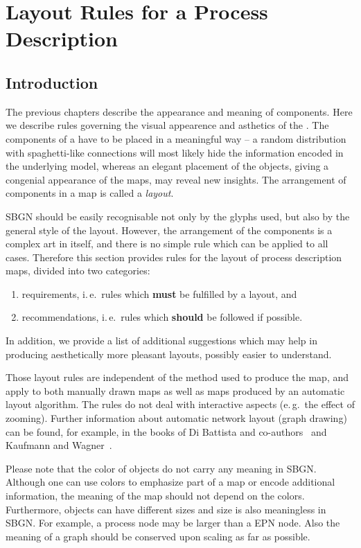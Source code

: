 \chapter{Layout Rules for a Process Description}
\label{chp:layout}

\section{Introduction}

The previous chapters describe the appearance and meaning of
\SBGNPDLone components. Here we describe rules governing the visual
appearence and asthetics of the \PDl. The components of a \PD have to
be placed in a meaningful way -- a random distribution with
spaghetti-like connections will most likely hide the information
encoded in the underlying model, whereas an elegant placement of the
objects, giving a congenial appearance of the maps, may reveal new
insights. The arrangement of components in a map is called a
\emph{layout}.

SBGN \PDs should be easily recognisable not only by the
glyphs used, but also by the general style of the layout. However, the
arrangement of the components is a complex art in itself, and there is
no simple rule which can be applied to all cases. Therefore this
section provides rules for the layout of process description maps, divided
into two categories:
\begin{enumerate}
  \item requirements, i.\,e.~rules which \textbf{must} be fulfilled by a
  layout, and
  \item recommendations, i.\,e.~rules which \textbf{should} be followed if
  possible. 
\end{enumerate}
In addition, we provide a list of additional suggestions which may help in producing aesthetically more pleasant layouts, possibly easier to understand.

Those layout rules are independent of the method used to produce
the map, and apply to both manually drawn maps as well as
maps produced by an automatic layout algorithm. The rules do
not deal with interactive aspects (e.\,g.~the effect of zooming). Further information about automatic network layout
(graph drawing) can be found, for example, in the books of Di Battista and
co-authors~\cite{DiBattista:1998} and Kaufmann and Wagner~\cite{Kaufmann:2001}.

Please note that the color of objects do not carry any meaning in
SBGN. Although one can use colors to emphasize part of a map or
encode additional information, the meaning of the map should not
depend on the colors. Furthermore, objects can have different sizes
and size is also meaningless in SBGN. For example, a process node
may be larger than a EPN node. Also the meaning of a graph
should be conserved upon scaling as far as possible.

